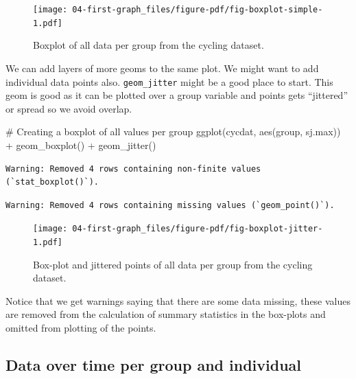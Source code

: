 \documentclass[
  11pt,
  letterpaper,
]{scrbook}
\newenvironment{Shaded}{\begin{snugshade}}{\end{snugshade}}
\newcommand{\CommentTok}[1]{\textcolor[rgb]{0.37,0.37,0.37}{#1}}
\newcommand{\FunctionTok}[1]{\textcolor[rgb]{0.28,0.35,0.67}{#1}}
\newcommand{\NormalTok}[1]{\textcolor[rgb]{0.00,0.23,0.31}{#1}}
\newcommand{\SpecialCharTok}[1]{\textcolor[rgb]{0.37,0.37,0.37}{#1}}
\begin{document}
\begin{figure}[H]

{\centering \texttt{[image: 04-first-graph\_files/figure-pdf/fig-boxplot-simple-1.pdf]}

}

\caption{\label{fig-boxplot-simple}Boxplot of all data per group from
the cycling dataset.}

\end{figure}

We can add layers of more geoms to the same plot. We might want to add
individual data points also. \texttt{geom\_jitter} might be a good place
to start. This geom is good as it can be plotted over a group variable
and points gets ``jittered'' or spread so we avoid overlap.

\begin{Shaded}
\begin{Highlighting}[numbers=left,,]
\CommentTok{\# Creating a boxplot of all values per group}
\FunctionTok{ggplot}\NormalTok{(cycdat, }\FunctionTok{aes}\NormalTok{(group, sj.max)) }\SpecialCharTok{+} \FunctionTok{geom\_boxplot}\NormalTok{() }\SpecialCharTok{+} \FunctionTok{geom\_jitter}\NormalTok{()}
\end{Highlighting}
\end{Shaded}

\begin{verbatim}
Warning: Removed 4 rows containing non-finite values (`stat_boxplot()`).
\end{verbatim}

\begin{verbatim}
Warning: Removed 4 rows containing missing values (`geom_point()`).
\end{verbatim}

\begin{figure}[H]

{\centering \texttt{[image: 04-first-graph\_files/figure-pdf/fig-boxplot-jitter-1.pdf]}

}

\caption{\label{fig-boxplot-jitter}Box-plot and jittered points of all
data per group from the cycling dataset.}

\end{figure}

Notice that we get warnings saying that there are some data missing,
these values are removed from the calculation of summary statistics in
the box-plots and omitted from plotting of the points.

\hypertarget{data-over-time-per-group-and-individual}{%
\subsection{Data over time per group and
individual}\label{data-over-time-per-group-and-individual}}
\end{document}
